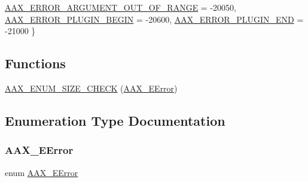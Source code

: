 \begin{DoxyCompactItemize}
\mbox{\hyperlink{a00494_a5f8c7439f3a706c4f8315a9609811937a8dd2fdd469583a046765eae9178678a3}{A\+A\+X\+\_\+\+E\+R\+R\+O\+R\+\_\+\+A\+R\+G\+U\+M\+E\+N\+T\+\_\+\+O\+U\+T\+\_\+\+O\+F\+\_\+\+R\+A\+N\+GE}} = -\/20050, 
\mbox{\hyperlink{a00494_a5f8c7439f3a706c4f8315a9609811937a71083c68ddd0e16973ba85383727ef9e}{A\+A\+X\+\_\+\+E\+R\+R\+O\+R\+\_\+\+P\+L\+U\+G\+I\+N\+\_\+\+B\+E\+G\+IN}} = -\/20600, 
\newline
\mbox{\hyperlink{a00494_a5f8c7439f3a706c4f8315a9609811937a2bfce952f1b95322cf4748c115533658}{A\+A\+X\+\_\+\+E\+R\+R\+O\+R\+\_\+\+P\+L\+U\+G\+I\+N\+\_\+\+E\+ND}} = -\/21000
 \}
\end{DoxyCompactItemize}
\subsection*{Functions}
\begin{DoxyCompactItemize}
\item 
\mbox{\hyperlink{a00494_aaba9e3f1468463f7ead56dfdf2cfa773}{A\+A\+X\+\_\+\+E\+N\+U\+M\+\_\+\+S\+I\+Z\+E\+\_\+\+C\+H\+E\+CK}} (\mbox{\hyperlink{a00494_a5f8c7439f3a706c4f8315a9609811937}{A\+A\+X\+\_\+\+E\+Error}})
\end{DoxyCompactItemize}


\subsection{Enumeration Type Documentation}
\mbox{\label{a00494_a5f8c7439f3a706c4f8315a9609811937}} 
\subsubsection{\texorpdfstring{AAX\_EError}{AAX\_EError}}
{\footnotesize\ttfamily enum \mbox{\hyperlink{a00494_a5f8c7439f3a706c4f8315a9609811937}{A\+A\+X\+\_\+\+E\+Error}}}

